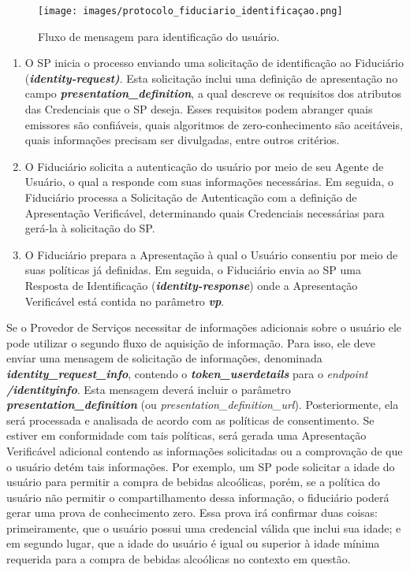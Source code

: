 \begin{figure}[h]
    \centering
    \texttt{[image: images/protocolo\_fiduciario\_identificaçao.png]}
    \caption{Fluxo de mensagem para identificação do usuário.}
    \label{fig:fluxo-identity}
\end{figure}

\begin{enumerate}
    \item O \acs{SP} inicia o processo enviando uma solicitação de identificação ao Fiduciário (\textit{\textbf{identity-request)}}. Esta solicitação inclui uma definição de apresentação no campo \textit{\textbf{presentation\_definition}}, a qual descreve os requisitos dos atributos das Credenciais que o \acs{SP} deseja. Esses requisitos podem abranger quais emissores são confiáveis, quais algoritmos de zero-conhecimento são aceitáveis, quais informações precisam ser divulgadas, entre outros critérios. 
    
    \item O Fiduciário solicita a autenticação do usuário por meio de seu Agente de Usuário, o qual a responde com suas informações necessárias. Em seguida, o Fiduciário  processa a Solicitação de Autenticação com a definição de Apresentação Verificável, determinando quais Credenciais necessárias para gerá-la à solicitação do \acs{SP}.
    
    \item O Fiduciário prepara a Apresentação à qual o Usuário  consentiu por meio de suas políticas já definidas. Em seguida, o Fiduciário envia ao \acs{SP} uma Resposta de Identificação (\textbf{\textit{identity-response}}) onde a Apresentação Verificável está contida no parâmetro \textbf{\textit{vp}}.

\end{enumerate}

Se o Provedor de Serviços necessitar de informações adicionais sobre o usuário ele pode utilizar o segundo fluxo de aquisição de informação. Para isso, ele deve enviar uma mensagem de solicitação de informações, denominada \textbf{\textit{identity\_request\_info}}, contendo o \textbf{\textit{token\_userdetails}} para o \textit{endpoint} \textit{\textbf{/identityinfo}}. Esta mensagem deverá incluir o parâmetro \textbf{\textit{presentation\_definition}} (ou \textit{presentation\_definition\_url}). Posteriormente, ela será processada e analisada de acordo com as políticas de consentimento. Se estiver em conformidade com tais políticas, será gerada uma Apresentação Verificável adicional contendo as informações solicitadas ou a comprovação de que o usuário detém tais informações. Por exemplo, um \acs{SP} pode solicitar a idade do usuário para permitir a compra de bebidas alcoólicas, porém, se a política do usuário não permitir o compartilhamento dessa informação, o fiduciário poderá gerar uma prova de conhecimento zero. Essa prova irá confirmar duas coisas: primeiramente, que o usuário possui uma credencial válida que inclui sua idade; e em segundo lugar, que a idade do usuário é igual ou superior à idade mínima requerida para a compra de bebidas alcoólicas no contexto em questão. \\ \\\


